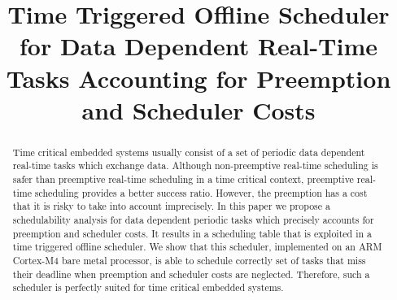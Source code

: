 \documentclass[conference,compsocconf]{IEEEtran}
\begin{document}
\title{Time Triggered Offline Scheduler for Data Dependent Real-Time Tasks
  Accounting for Preemption and Scheduler Costs}


\author{
\and    
{}
\and    
{}
}


\maketitle

\begin{abstract} Time critical embedded systems usually consist of a set of
  periodic data dependent real-time tasks which exchange data. Although
  non-preemptive real-time scheduling is safer than preemptive real-time
  scheduling in a time critical context, preemptive real-time scheduling
  provides a better success ratio. However, the preemption has a cost that it
  is risky to take into account imprecisely. In this paper we propose a
  schedulability analysis for data dependent periodic tasks which precisely
  accounts for preemption and scheduler costs. It results in a scheduling table
  that is exploited in a time triggered offline scheduler. We show that this
  scheduler, implemented on an ARM Cortex-M4 bare metal processor,
  is able to schedule correctly set of tasks that miss their deadline when
  preemption and scheduler costs are neglected. Therefore, such a scheduler is
  perfectly suited for time critical embedded systems.
\end{abstract}
\end{document}
